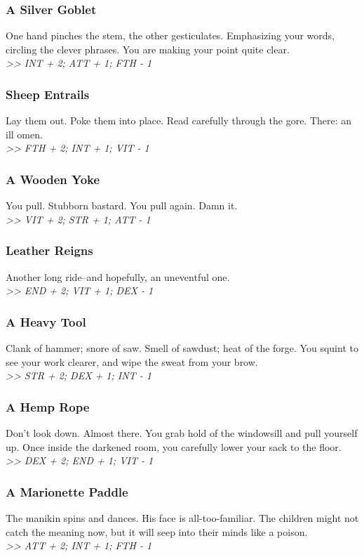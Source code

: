 \begin{multicols*}{2}
\subsubsection*{A Silver Goblet}
One hand pinches the stem, the other gesticulates. Emphasizing your words, circling the clever phrases. You are making your point quite clear.\\
\emph{>> INT + 2; ATT + 1; FTH - 1}

\subsubsection*{Sheep Entrails}
Lay them out. Poke them into place. Read carefully through the gore. There: an ill omen.\\
\emph{>> FTH + 2; INT + 1; VIT - 1}

\vfill
\columnbreak

\subsubsection*{A Wooden Yoke}
You pull. Stubborn bastard. You pull again. Damn it.\\
\emph{>> VIT + 2; STR + 1; ATT - 1}

\subsubsection*{Leather Reigns}
Another long ride--and hopefully, an uneventful one.\\
\emph{>> END + 2; VIT + 1; DEX - 1}

\subsubsection*{A Heavy Tool}
Clank of hammer; snore of saw. Smell of sawdust; heat of the forge. You squint to see your work clearer, and wipe the sweat from your brow.\\
\emph{>> STR + 2; DEX + 1; INT - 1}

\subsubsection*{A Hemp Rope}
Don’t look down. Almost there. You grab hold of the windowsill and pull yourself up. Once inside the darkened room, you carefully lower your sack to the floor.\\
\emph{>> DEX + 2; END + 1; VIT - 1}

\subsubsection*{A Marionette Paddle}
The manikin spins and dances. His face is all-too-familiar. The children might not catch the meaning now, but it will seep into their minds like a poison.\\
\emph{>> ATT + 2; INT + 1; FTH - 1}


\end{multicols*}
